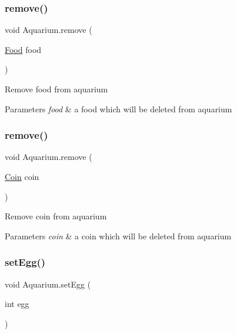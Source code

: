\subsubsection{\texorpdfstring{remove()}{remove()}\hspace{0.1cm}{\footnotesize\ttfamily [4/5]}}
{\footnotesize\ttfamily void Aquarium.\+remove (\begin{DoxyParamCaption}\item[{\mbox{\hyperlink{class_food}{Food}}}]{food }\end{DoxyParamCaption})\hspace{0.3cm}{\ttfamily [inline]}}

Remove food from aquarium 
\begin{DoxyParams}{Parameters}
{\em food} & a food which will be deleted from aquarium \\
\hline
\end{DoxyParams}
\mbox{\label{class_aquarium_a39119dfb953c89eac41fda5c3b6834f0}} 
\subsubsection{\texorpdfstring{remove()}{remove()}\hspace{0.1cm}{\footnotesize\ttfamily [5/5]}}
{\footnotesize\ttfamily void Aquarium.\+remove (\begin{DoxyParamCaption}\item[{\mbox{\hyperlink{class_coin}{Coin}}}]{coin }\end{DoxyParamCaption})\hspace{0.3cm}{\ttfamily [inline]}}

Remove coin from aquarium 
\begin{DoxyParams}{Parameters}
{\em coin} & a coin which will be deleted from aquarium \\
\hline
\end{DoxyParams}
\mbox{\label{class_aquarium_a328d46bba95f6c4db241e8a4ac54e1fc}} 
\subsubsection{\texorpdfstring{set\+Egg()}{setEgg()}}
{\footnotesize\ttfamily void Aquarium.\+set\+Egg (\begin{DoxyParamCaption}\item[{int}]{egg }\end{DoxyParamCaption})\hspace{0.3cm}{\ttfamily [inline]}}

